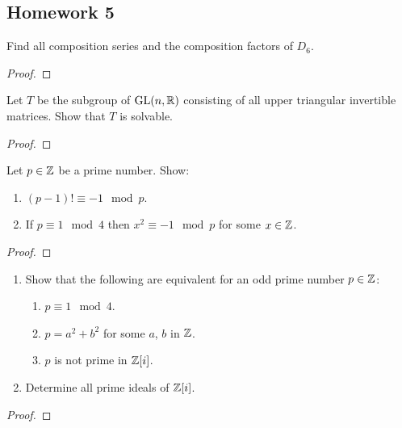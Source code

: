 \subsection{Homework 5}
\begin{problem}
  Find all composition series and the composition factors of $D_6$.
\end{problem}
\begin{proof}
\end{proof}

\begin{problem}
  Let $T$ be the subgroup of $\mathrm{GL}(n,\mathbb{R})$ consisting of all upper
  triangular invertible matrices. Show that $T$ is solvable.
\end{problem}
\begin{proof}
\end{proof}

\begin{problem}
  Let $p\in\mathbb{Z}$ be a prime number. Show:
  \begin{enumerate}[label=(\alph*),noitemsep]
  \item $(p-1)!\equiv -1\mod{p}$.
  \item If $p\equiv 1\mod{4}$ then $x^2\equiv-1\mod{p}$ for some
    $x\in\mathbb{Z}$.
  \end{enumerate}
\end{problem}
\begin{proof}
\end{proof}

\begin{problem}
  \begin{enumerate}[label=(\alph*),noitemsep]
  \item Show that the following are equivalent for an odd prime number
    $p\in\mathbb{Z}$:
    \begin{enumerate}[label=(\roman*),noitemsep]
    \item $p\equiv 1\mod 4$.
    \item $p=a^2+b^2$ for some $a$, $b$ in $\mathbb{Z}$.
    \item $p$ is not prime in $\mathbb{Z}[i]$.
    \end{enumerate}
  \item Determine all prime ideals of $\mathbb{Z}[i]$.
  \end{enumerate}
\end{problem}
\begin{proof}
\end{proof}

